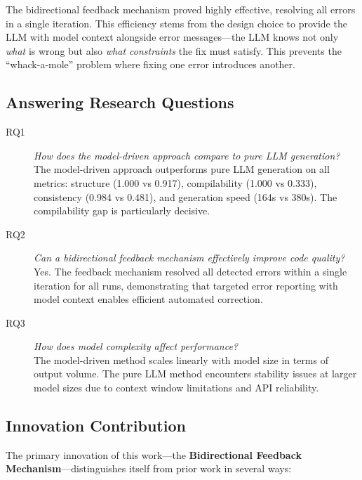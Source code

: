 \documentclass[11pt,a4paper]{article}
\begin{document}
The bidirectional feedback mechanism proved highly effective, resolving all errors in a single iteration. This efficiency stems from the design choice to provide the LLM with model context alongside error messages---the LLM knows not only \emph{what} is wrong but also \emph{what constraints} the fix must satisfy. This prevents the ``whack-a-mole'' problem where fixing one error introduces another.

\subsection{Answering Research Questions}

\begin{description}
    \item[RQ1] \emph{How does the model-driven approach compare to pure LLM generation?}\\
    The model-driven approach outperforms pure LLM generation on all metrics: structure (1.000 vs 0.917), compilability (1.000 vs 0.333), consistency (0.984 vs 0.481), and generation speed (164s vs 380s). The compilability gap is particularly decisive.

    \item[RQ2] \emph{Can a bidirectional feedback mechanism effectively improve code quality?}\\
    Yes. The feedback mechanism resolved all detected errors within a single iteration for all runs, demonstrating that targeted error reporting with model context enables efficient automated correction.

    \item[RQ3] \emph{How does model complexity affect performance?}\\
    The model-driven method scales linearly with model size in terms of output volume. The pure LLM method encounters stability issues at larger model sizes due to context window limitations and API reliability.
\end{description}

\subsection{Innovation Contribution}

The primary innovation of this work---the \textbf{Bidirectional Feedback Mechanism}---distinguishes itself from prior work in several ways:
\end{document}
